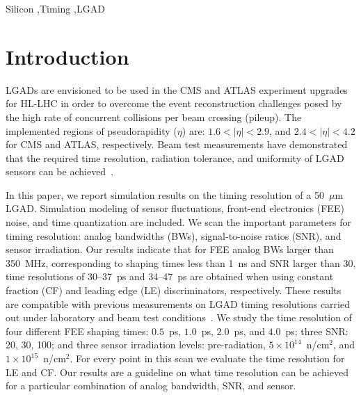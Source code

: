 \documentclass[preprint,1p]{elsarticle}
\begin{document}
\begin{frontmatter}
\begin{keyword}

Silicon \sep Timing \sep LGAD

\end{keyword}

\end{frontmatter}

\tableofcontents


\section{Introduction}

LGADs are envisioned to be used in the CMS and ATLAS experiment upgrades for HL-LHC in order to overcome
the event reconstruction challenges posed by the high rate of concurrent
collisions per beam crossing (pileup). The implemented regions of pseudorapidity ($\eta$)
are: $1.6< |\eta| <2.9$, and $2.4< |\eta|<4.2$ for CMS and ATLAS, respectively.
 Beam test measurements have demonstrated that the required time resolution,
radiation tolerance, and uniformity of LGAD sensors can be achieved~\cite{Apresyan:2018oln}.

In this paper, we report simulation results on the
timing resolution of a 50~$\mu$m LGAD. Simulation modeling of 
sensor fluctuations, front-end electronics (FEE) noise, and time quantization are included. 
We scan the important parameters for timing resolution: analog bandwidths (BWs),
signal-to-noise ratios (SNR), and sensor irradiation.
Our results indicate that for FEE analog BWs larger than 350~\si{MHz},
corresponding to shaping times less than 1~\si{ns} and SNR larger than 30, time resolutions of 30--37~\si{ps} and 34--47~\si{ps}
are obtained when using constant fraction (CF) and leading edge (LE) discriminators, respectively.
These results are compatible with previous measurements on LGAD timing resolutions carried out under
laboratory and beam test conditions~\cite{Apresyan:2018oln, Cartiglia201783, PELLEGRINI201412}.
We study the time resolution of four different FEE shaping times: $0.5$~\si{ps}, $1.0$~\si{ps},
$2.0$~\si{ps}, and $4.0$~\si{ps}; three SNR: 20, 30, 100; and three sensor irradiation
levels: pre-radiation, $5\times 10^{14}$~n/cm$^2$, and $1\times 10^{15}$~n/cm$^2$.
For every point in this scan we evaluate the time resolution for LE and CF.
Our results are a guideline on what time resolution can
be achieved for a particular combination of analog bandwidth, SNR, and sensor.
\end{document}

